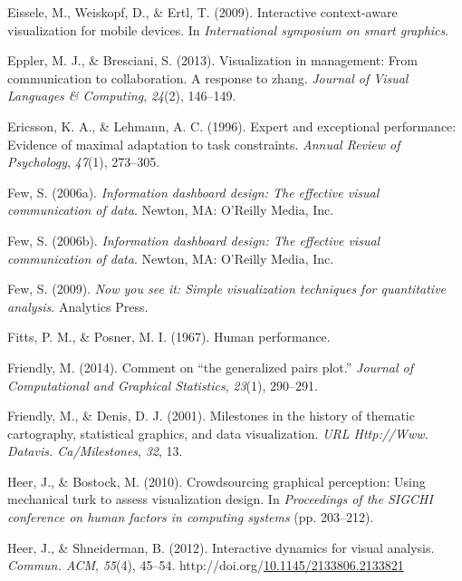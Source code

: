 \documentclass[print]{nuthesis}
\newlength{\cslhangindent}
\newenvironment{CSLReferences}[2]%
{\setlength{\parindent}{0pt}%
\everypar{\setlength{\hangindent}{\cslhangindent}}\ignorespaces}%
{\par}
\begin{document}
\begin{CSLReferences}{1}{0}
\leavevmode{}%
Eissele, M., Weiskopf, D., \& Ertl, T. (2009). Interactive context-aware visualization for mobile devices. In \emph{International symposium on smart graphics}.

\leavevmode{}%
Eppler, M. J., \& Bresciani, S. (2013). Visualization in management: From communication to collaboration. A response to zhang. \emph{Journal of Visual Languages \& Computing}, \emph{24}(2), 146--149.

\leavevmode{}%
Ericsson, K. A., \& Lehmann, A. C. (1996). Expert and exceptional performance: Evidence of maximal adaptation to task constraints. \emph{Annual Review of Psychology}, \emph{47}(1), 273--305.

\leavevmode{}%
Few, S. (2006a). \emph{Information dashboard design: The effective visual communication of data}. Newton, MA: O'Reilly Media, Inc.

\leavevmode{}%
Few, S. (2006b). \emph{Information dashboard design: The effective visual communication of data}. Newton, MA: O'Reilly Media, Inc.

\leavevmode{}%
Few, S. (2009). \emph{Now you see it: Simple visualization techniques for quantitative analysis}. Analytics Press.

\leavevmode{}%
Fitts, P. M., \& Posner, M. I. (1967). Human performance.

\leavevmode{}%
Friendly, M. (2014). Comment on {``the generalized pairs plot.''} \emph{Journal of Computational and Graphical Statistics}, \emph{23}(1), 290--291.

\leavevmode{}%
Friendly, M., \& Denis, D. J. (2001). Milestones in the history of thematic cartography, statistical graphics, and data visualization. \emph{URL Http://Www. Datavis. Ca/Milestones}, \emph{32}, 13.

\leavevmode{}%
Heer, J., \& Bostock, M. (2010). Crowdsourcing graphical perception: Using mechanical turk to assess visualization design. In \emph{Proceedings of the SIGCHI conference on human factors in computing systems} (pp. 203--212).

\leavevmode{}%
Heer, J., \& Shneiderman, B. (2012). Interactive dynamics for visual analysis. \emph{Commun. ACM}, \emph{55}(4), 45--54. http://doi.org/\href{https://doi.org/10.1145/2133806.2133821}{10.1145/2133806.2133821}


\end{CSLReferences}
\end{document}
